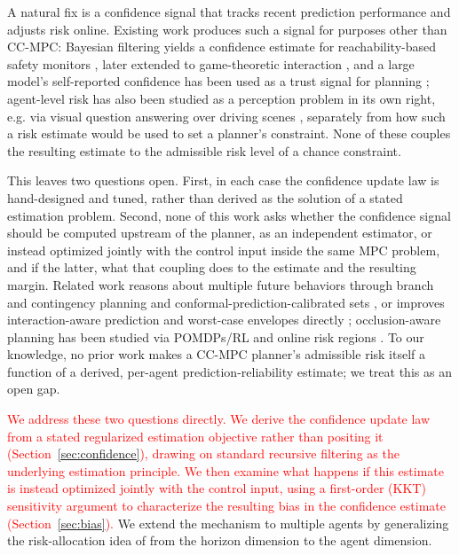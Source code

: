 \documentclass[letterpaper, 10 pt, conference]{ieeeconf}
\begin{document}
A natural fix is a confidence signal that tracks recent prediction performance and adjusts risk online. Existing work produces such a signal for purposes other than CC-MPC: Bayesian filtering yields a confidence estimate for reachability-based safety monitors \cite{fisac2018general}, later extended to game-theoretic interaction \cite{tian2022safety}, and a large model's self-reported confidence has been used as a trust signal for planning \cite{yao2024calmm}; agent-level risk has also been studied as a perception problem in its own right, e.g. via visual question answering over driving scenes \cite{gao2025nurisk}, separately from how such a risk estimate would be used to set a planner's constraint. None of these couples the resulting estimate to the admissible risk level of a chance constraint.

This leaves two questions open. First, in each case the confidence update law is hand-designed and tuned, rather than derived as the solution of a stated estimation problem. Second, none of this work asks whether the confidence signal should be computed upstream of the planner, as an independent estimator, or instead optimized jointly with the control input inside the same MPC problem, and if the latter, what that coupling does to the estimate and the resulting margin. Related work reasons about multiple future behaviors through branch and contingency planning \cite{li2023marc,mustafa2024racp} and conformal-prediction-calibrated sets \cite{dixit2023adaptive}, or improves interaction-aware prediction and worst-case envelopes directly \cite{sadigh2016planning,schwarting2018planning,fisac2019hierarchical,shalev2017formal}; occlusion-aware planning has been studied via POMDPs/RL \cite{isele2018navigating} and online risk regions \cite{yu2019occlusion}. To our knowledge, no prior work makes a CC-MPC planner's admissible risk itself a function of a derived, per-agent prediction-reliability estimate; we treat this as an open gap.


\textcolor{red}{We address these two questions directly. We derive the confidence update law from a stated regularized estimation objective rather than positing it (Section~\ref{sec:confidence}), drawing on standard recursive filtering \cite{5311910} as the underlying estimation principle. We then examine what happens if this estimate is instead optimized jointly with the control input, using a first-order (KKT) sensitivity argument \cite{wright1999numerical} to characterize the resulting bias in the confidence estimate (Section~\ref{sec:bias}).} We extend the mechanism to multiple agents by generalizing the risk-allocation idea of \cite{ono2008iterative} from the horizon dimension to the agent dimension.
\end{document}
